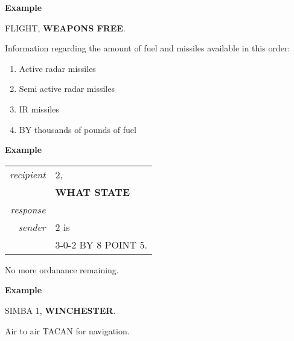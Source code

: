\begin{tcoloritemize}
    \medskip
    \textbf{Example}
    \begin{center}
        \begin{minipage}{0.9\textwidth}
            FLIGHT, \textbf{WEAPONS FREE}.
        \end{minipage}
    \end{center}

    Information regarding the amount of fuel and missiles available in this order:
    \begin{enumerate}
        \item Active radar missiles
        \item Semi active radar missiles
        \item IR missiles
        \item BY thousands of pounds of fuel
    \end{enumerate}

    \medskip
    \textbf{Example}
    \begin{center}
        \begin{tabular}{>{\itshape}r l}
            recipient & 2, \\
            & \textbf{WHAT STATE} \\
            response \\
            sender & 2 is   \\
            & 3-0-2 BY 8 POINT 5. \\
        \end{tabular}
    \end{center}

    \blueitem[WINCHESTER]
    No more ordanance remaining.

    \medskip
    \textbf{Example}
    \begin{center}
        \begin{minipage}{0.9\textwidth}
            SIMBA 1, \textbf{WINCHESTER}.
        \end{minipage}
    \end{center}

    \blueitem[YARDSTICK]
    Air to air TACAN for navigation.

\end{tcoloritemize}